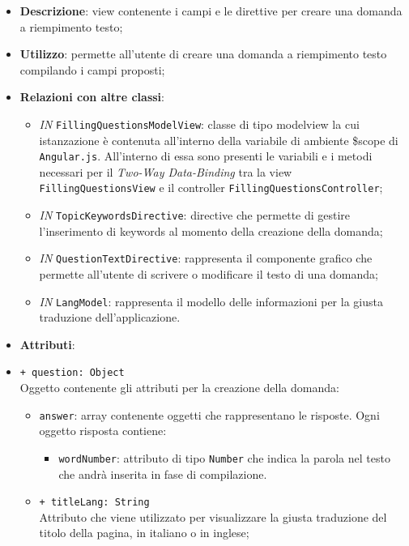 \begin{itemize}
	\item \textbf{Descrizione}: view contenente i campi e le direttive per creare una domanda a riempimento testo;
	\item \textbf{Utilizzo}:  permette all'utente di creare una domanda a riempimento testo compilando i campi proposti;
	\item \textbf{Relazioni con altre classi}:
	\begin{itemize}
		\item \textit{IN} \texttt{FillingQuestionsModelView}: classe di tipo modelview la cui istanzazione è contenuta all'interno della variabile di ambiente \$scope di \texttt{Angular.js}. All'interno di essa sono presenti le variabili e i metodi necessari per il \textit{Two-Way Data-Binding} tra la view \texttt{FillingQuestionsView} e il controller \texttt{FillingQuestionsController};
		\item \textit{IN} \texttt{TopicKeywordsDirective}: directive che permette di gestire l'inserimento di keywords al momento della creazione della domanda;
		\item \textit{IN} \texttt{QuestionTextDirective}: rappresenta il componente grafico che permette all'utente di scrivere o modificare il testo di una domanda;
		\item \textit{IN} \texttt{LangModel}: rappresenta il modello delle informazioni per la giusta traduzione dell'applicazione.
	\end{itemize}
	\item \textbf{Attributi}:
	\item \texttt{+ question: Object} \\ Oggetto contenente gli attributi per la creazione della domanda:
	\begin{itemize}
		\item \texttt{answer}: array contenente oggetti che rappresentano le risposte. Ogni oggetto risposta contiene:
		\begin{itemize}
			\item \texttt{wordNumber}: attributo di tipo \texttt{Number} che indica la parola nel testo che andrà inserita in fase di compilazione.
		\end{itemize}
	\end{itemize}	
	\begin{itemize}
		\item \texttt{+ titleLang: String} \\ Attributo che viene utilizzato per visualizzare la giusta traduzione del titolo della pagina, in italiano o in inglese;

\end{itemize}
\end{itemize}
